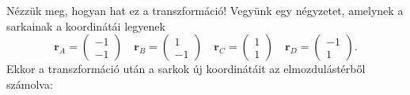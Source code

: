 \documentclass[12pt,a4paper]{scrartcl}
\let\mathbf\bm
\begin{document}
Nézzük meg, hogyan hat ez a transzformáció! Vegyünk egy négyzetet, amelynek a sarkainak a koordinátái legyenek 
\[{{\mathbf{r}}_A} = \left( {\begin{array}{*{20}{c}}
  { - 1} \\ 
  { - 1} 
\end{array}} \right)\quad {{\mathbf{r}}_B} = \left( {\begin{array}{*{20}{c}}
  1 \\ 
  { - 1} 
\end{array}} \right)\quad {{\mathbf{r}}_C} = \left( {\begin{array}{*{20}{c}}
  1 \\ 
  1 
\end{array}} \right)\quad {{\mathbf{r}}_D} = \left( {\begin{array}{*{20}{c}}
  { - 1} \\ 
  1 
\end{array}} \right).\]
Ekkor a transzformáció után a sarkok új koordinátáit az elmozdulástérből számolva:
\end{document}
